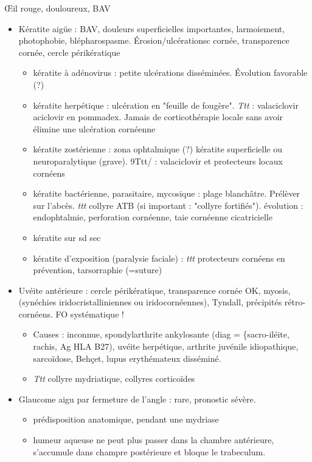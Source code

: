 \documentclass[11pt]{article}
\begin{document}
\OE{}il rouge, douloureux, BAV
\begin{itemize}
\item Kératite aigüe : BAV, douleurs
superficielles importantes, larmoiement, photophobie,
blépharospasme. Érosion/ulcérationsc cornée, \dec transparence cornée,
cercle périkératique
\begin{itemize}
\item kératite à adénovirus : petite ulcérations disséminées. Évolution favorable
(?)
\item kératite herpétique : ulcération en "feuille de fougère". \emph{Ttt} :
valaciclovir \textpm{} aciclovir en pommadex. Jamais de corticothérapie locale
sans avoir élimine une ulcération cornéenne \skull
\item kératite zostérienne : zona ophtalmique \thus (?) kératite superficielle ou
neuroparalytique (grave). 9Ttt/ : valaciclovir et protecteurs locaux
cornéens
\item kératite bactérienne, parasitaire, mycosique : plage blanchâtre. Prélèver
sur l'abcès. \emph{ttt} collyre ATB (si important : "collyre fortifiés"). \danger
évolution : endophtalmie, perforation cornéenne, taie cornéenne cicatricielle
\item kératite sur sd sec
\item kératite d'exposition (paralysie faciale) : \emph{ttt} protecteurs cornéens en
prévention, tarsorraphie (=suture)
\end{itemize}
\item Uvéite antérieure : cercle périkératique, transparence cornée OK, myosis,
(synéchies iridocristalliniennes ou iridocornéennes), Tyndall, précipités
rétro-cornéens. FO systématique ! 
\begin{itemize}
\item Causes : inconnue, spondylarthrite ankylosante (diag = \{sacro-iléite, rachis,
Ag HLA B27), uvéite herpétique, arthrite juvénile idiopathique, sarcoïdose,
Behçet, lupus erythémateux disséminé.
\item \emph{Ttt} collyre mydriatique, collyres corticoïdes
\end{itemize}
\item Glaucome aigu par fermeture de l'angle : rare, pronostic sévère.
\begin{itemize}
\item prédisposition anatomique, pendant une mydriase
\item humeur aqueuse ne peut plus passer dans la chambre antérieure, s'accumule
dans champre postérieure et bloque le trabeculum.

\end{itemize}
\end{itemize}
\end{document}
